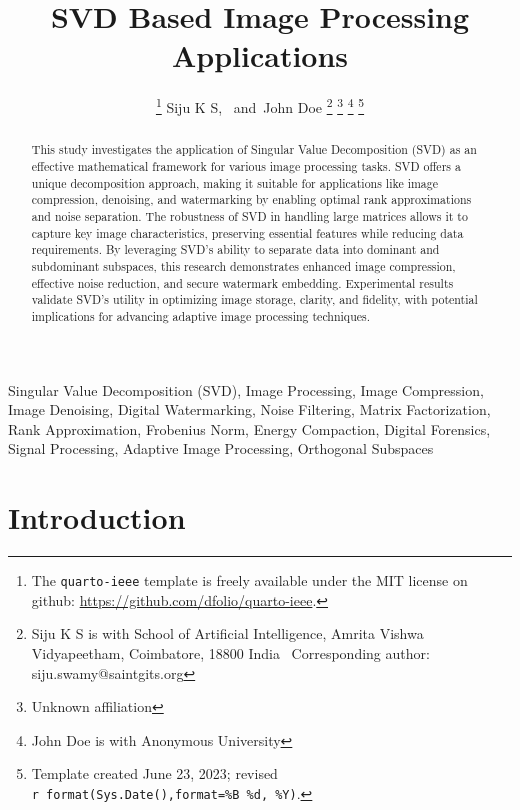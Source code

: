\documentclass[
  journal,
]{IEEEtran}%
\title{SVD Based Image Processing Applications}
\author{
\thanks{The \texttt{quarto-ieee} template is freely available under the
MIT license on github: \url{https://github.com/dfolio/quarto-ieee}.}
Siju K S\orcidlink{0009-0004-1983-5574},~\IEEEmembership{Member, IEEE}
and~John Doe%
\thanks{Siju K S is with School of Artificial Intelligence, Amrita
Vishwa Vidyapeetham, Coimbatore, 18800 India%
  Corresponding author: siju.swamy@saintgits.org
}
\thanks{Unknown affiliation}
\thanks{John Doe is with Anonymous University%
}
\thanks{Template created June 23, 2023; revised
\texttt{r\ format(Sys.Date(),format=\textquotesingle{}\%B\ \%d,\ \%Y\textquotesingle{})}.}
}
\begin{document}


\maketitle

\begin{abstract}
This study investigates the application of Singular Value Decomposition
(SVD) as an effective mathematical framework for various image
processing tasks. SVD offers a unique decomposition approach, making it
suitable for applications like image compression, denoising, and
watermarking by enabling optimal rank approximations and noise
separation. The robustness of SVD in handling large matrices allows it
to capture key image characteristics, preserving essential features
while reducing data requirements. By leveraging SVD's ability to
separate data into dominant and subdominant subspaces, this research
demonstrates enhanced image compression, effective noise reduction, and
secure watermark embedding. Experimental results validate SVD's utility
in optimizing image storage, clarity, and fidelity, with potential
implications for advancing adaptive image processing techniques.
\end{abstract}
\begin{IEEEkeywords}
Singular Value Decomposition (SVD), Image Processing, Image
Compression, Image Denoising, Digital Watermarking, Noise
Filtering, Matrix Factorization, Rank Approximation, Frobenius
Norm, Energy Compaction, Digital Forensics, Signal Processing, Adaptive
Image Processing, Orthogonal Subspaces
\end{IEEEkeywords}

%


\section{Introduction}\label{introduction}
\end{document}
